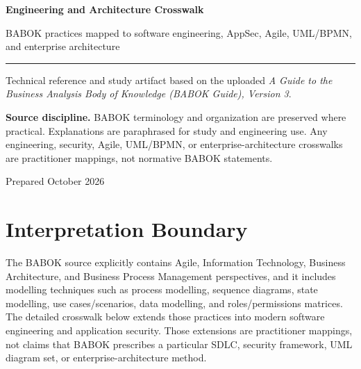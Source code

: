 \documentclass[11pt]{article}
\begin{document}
\hypersetup{pageanchor=false}%
\begin{titlepage}
\centering
\vspace*{1.15in}
{\Huge\bfseries\color{BANavy} Engineering and Architecture Crosswalk\par}
\vspace{0.35in}
{\Large\color{BAOrange} BABOK practices mapped to software engineering, AppSec, Agile, UML/BPMN, and enterprise architecture\par}
\vspace{0.55in}
\rule{0.78\textwidth}{1.2pt}\par
\vspace{0.35in}
{\large Technical reference and study artifact based on the uploaded \emph{A Guide to the Business Analysis Body of Knowledge (BABOK Guide), Version 3}.\par}
\vfill
\begin{keybox}
\textbf{Source discipline.} BABOK terminology and organization are preserved where practical. Explanations are paraphrased for study and engineering use. Any engineering, security, Agile, UML/BPMN, or enterprise-architecture crosswalks are practitioner mappings, not normative BABOK statements.
\end{keybox}
\vspace{0.35in}
{\small Prepared October 2026\par}
\end{titlepage}\hypersetup{pageanchor=true}
\tableofcontents
\newpage
\section{Interpretation Boundary}
The BABOK source explicitly contains Agile, Information Technology, Business Architecture, and Business Process Management perspectives, and it includes modelling techniques such as process modelling, sequence diagrams, state modelling, use cases/scenarios, data modelling, and roles/permissions matrices. The detailed crosswalk below extends those practices into modern software engineering and application security. Those extensions are practitioner mappings, not claims that BABOK prescribes a particular SDLC, security framework, UML diagram set, or enterprise-architecture method.
\end{document}

